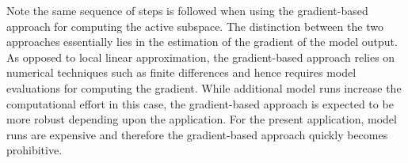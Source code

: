 \bigskip
%
Note the same sequence of steps is followed when using the gradient-based approach for computing the
active subspace. The distinction between the two approaches essentially lies in the estimation of
the gradient of the model output. As opposed to local linear approximation, the gradient-based
approach relies on numerical techniques such as finite differences and hence requires model evaluations
for computing the gradient. While additional model runs increase the computational effort in this case,
the gradient-based approach is expected to be more robust depending upon the application. For the present
application, model runs are expensive and therefore the gradient-based approach quickly becomes prohibitive.

